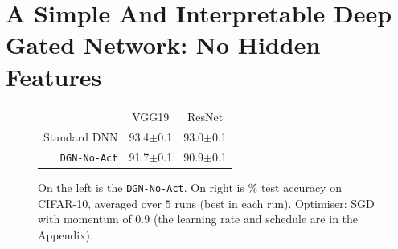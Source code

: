 \section{A Simple And Interpretable Deep Gated  Network: No Hidden Features}\label{sec:interpret}
\begin{figure}
\centering
\begin{minipage}{0.3\columnwidth}
\centering
{}
\end{minipage}
\begin{minipage}{0.4\columnwidth}
\begin{tabular}{rcc}
\toprule
&VGG19 & ResNet\\
Standard DNN&93.4\tiny{$\pm$0.1} &93.0\tiny{$\pm$0.1} \\
\texttt{DGN-No-Act}&91.7\tiny{$\pm$0.1}&90.9\tiny{$\pm$0.1} \\
\bottomrule
\end{tabular}
\end{minipage}
\caption{\small On the left is the \texttt{DGN-No-Act}. On right is $\%$ test accuracy on CIFAR-10, averaged over $5$ runs (best in each run). Optimiser: SGD with momentum of 0.9 (the learning rate and schedule are in the Appendix).}
\label{fig:dgn-no-act}
\end{figure}
